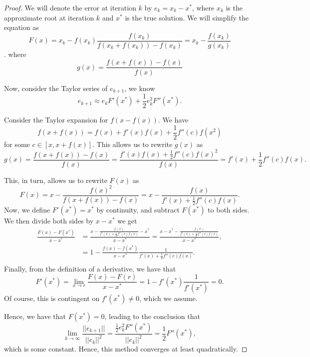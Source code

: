\documentclass{article}
\begin{document}
\begin{proof}
    We will denote the error at iteration $k$ by $e_k = x_k - x^*$, where
    $x_k$ is the approximate root at iteration $k$ and $x^*$ is the
    true solution. We will simplify the equation as
    \[F(x) = x_k - f(x_k)\frac{f(x_k)}{f(x_k + f(x_k))-f(x_k)} =
        x_k - \frac{f(x_k)}{g(x_k)}\].
    where
    \[g(x) = \frac{f(x+f(x)) - f(x)}{f(x)}\]

    Now, consider the Taylor series of $e_{k+1}$, we know
    \[e_{k+1} \approx e_k F'(x^*) + \frac{1}{2}e^2_k F''(x^*).\]

    Consider the Taylor expansion for $f(x - f(x))$. We have
    \[f(x + f(x)) = f(x) + f'(x)f(x) + \frac{1}{2}f''(c)f(x^2)\]
    for some $c \in [x, x + f(x)]$. This allows us to rewrite $g(x)$ as
    \begin{equation*}
        g(x) = \frac{f(x+f(x)) - f(x)}{f(x)}
        = \frac{f'(x)f(x) + \frac{1}{2}f''(c)f(x)^2}{f(x)}
        = f'(x) + \frac{1}{2}f''(c)f(x).
    \end{equation*}

    This, in turn, allows us to rewrite $F(x)$ as
    \begin{equation*}
        F(x) = x - \frac{f(x)^2}{f(x + f(x)) - f(x)}
        = x - \frac{f(x)}{f'(x) + \frac{1}{2}f''(c)f(x)}.
    \end{equation*}
    Now, we define $F'(x^*) = x^*$ by continuity, and subtract $F(x^*)$ to
    both sides. We then divide both sides by $x - x^*$ we get
    \begin{align*}
        \frac{F(x) - F(x^*)}{x - x^*}
         & = \frac{x - \frac{f(x)}{f'(x) + \frac{1}{2}f''(c)f(x)} - x^*}{x - x^*}
        = \frac{x - x^* - \frac{f(x)}{f'(x) + \frac{1}{2}f''(c)f(x)}}{x - x^*},        \\
         & = 1 - \frac{f(x) - f(x^*)}{x - x^*}\frac{1}{f'(x) + \frac{1}{2}f''(c)f(x)}. \\
    \end{align*}
    Finally, from the definition of a derivative, we have that
    \begin{equation*}
        F'(x^*) = \lim_{x\rightarrow r} \frac{F(x) - F(r)}{x - x^*}
        = 1 - f'(x^*)\frac{1}{f'(x^*)} = 0.
    \end{equation*}
    Of course, this is contingent on $f'(x^*) \neq 0$, which we assume.

    Hence, we have that $F(x^*) = 0$, leading to the conclusion that
    \begin{equation*}
        \lim_{k\rightarrow\infty} \frac{||e_{k+1}||}{||e_k||^2}
        = \frac{\frac{1}{2}e^2_k F''(x^*)}{||e_k||^2} = \frac{1}{2}F''(x^*),
    \end{equation*}
    which is some constant. Hence, this method converges at least quadratically.



\end{proof}
\end{document}
